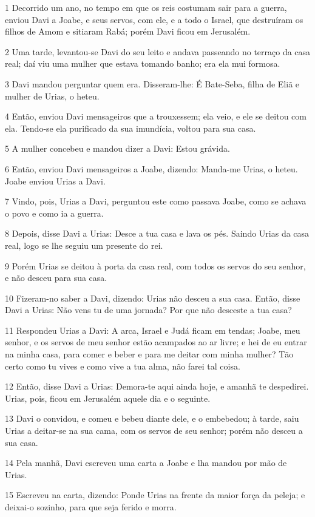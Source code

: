 \par 1 Decorrido um ano, no tempo em que os reis costumam sair para a guerra, enviou Davi a Joabe, e seus servos, com ele, e a todo o Israel, que destruíram os filhos de Amom e sitiaram Rabá; porém Davi ficou em Jerusalém.
\par 2 Uma tarde, levantou-se Davi do seu leito e andava passeando no terraço da casa real; daí viu uma mulher que estava tomando banho; era ela mui formosa.
\par 3 Davi mandou perguntar quem era. Disseram-lhe: É Bate-Seba, filha de Eliã e mulher de Urias, o heteu.
\par 4 Então, enviou Davi mensageiros que a trouxessem; ela veio, e ele se deitou com ela. Tendo-se ela purificado da sua imundícia, voltou para sua casa.
\par 5 A mulher concebeu e mandou dizer a Davi: Estou grávida.
\par 6 Então, enviou Davi mensageiros a Joabe, dizendo: Manda-me Urias, o heteu. Joabe enviou Urias a Davi.
\par 7 Vindo, pois, Urias a Davi, perguntou este como passava Joabe, como se achava o povo e como ia a guerra.
\par 8 Depois, disse Davi a Urias: Desce a tua casa e lava os pés. Saindo Urias da casa real, logo se lhe seguiu um presente do rei.
\par 9 Porém Urias se deitou à porta da casa real, com todos os servos do seu senhor, e não desceu para sua casa.
\par 10 Fizeram-no saber a Davi, dizendo: Urias não desceu a sua casa. Então, disse Davi a Urias: Não vens tu de uma jornada? Por que não desceste a tua casa?
\par 11 Respondeu Urias a Davi: A arca, Israel e Judá ficam em tendas; Joabe, meu senhor, e os servos de meu senhor estão acampados ao ar livre; e hei de eu entrar na minha casa, para comer e beber e para me deitar com minha mulher? Tão certo como tu vives e como vive a tua alma, não farei tal coisa.
\par 12 Então, disse Davi a Urias: Demora-te aqui ainda hoje, e amanhã te despedirei. Urias, pois, ficou em Jerusalém aquele dia e o seguinte.
\par 13 Davi o convidou, e comeu e bebeu diante dele, e o embebedou; à tarde, saiu Urias a deitar-se na sua cama, com os servos de seu senhor; porém não desceu a sua casa.
\par 14 Pela manhã, Davi escreveu uma carta a Joabe e lha mandou por mão de Urias.
\par 15 Escreveu na carta, dizendo: Ponde Urias na frente da maior força da peleja; e deixai-o sozinho, para que seja ferido e morra.
